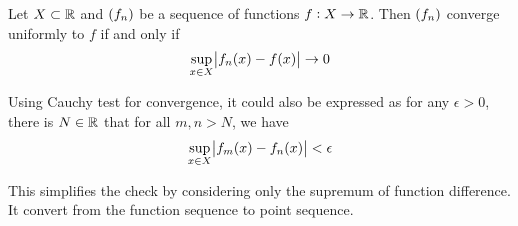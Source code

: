 \begin{theorem}
    Let $X \subset \mathbb{R}$ and $\sequence{f_n}$ be a sequence of functions $f: X \rightarrow \mathbb{R}$. Then $\sequence{f_n}$ converge uniformly to $f$ if and only if 
    \begin{equation}
        \sup_{x \in X} \abs{f_n(x) - f(x)} \rightarrow 0
    \end{equation}
    
    Using Cauchy test for convergence, it could also be expressed as for any $\epsilon > 0$, there is $N \in \mathbb{R}$ that for all $m,n>N$, we have
    \begin{equation}
        \sup_{x \in X} \abs{f_m(x) - f_n(x)} < \epsilon
    \end{equation}
    
    This simplifies the check by considering only the supremum of function difference. It convert from the function sequence to point sequence.
\end{theorem}
  








































































